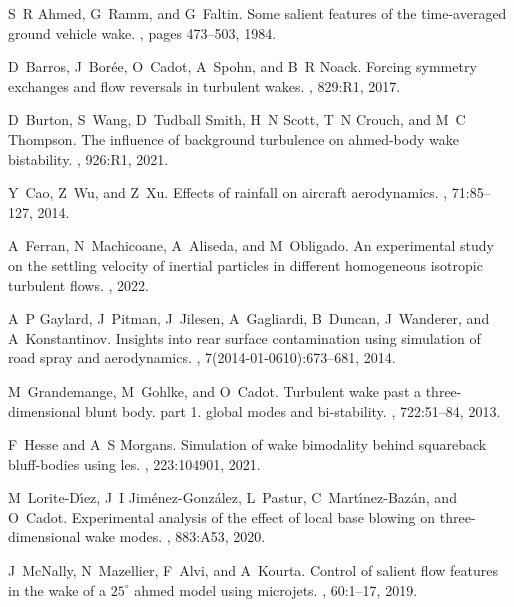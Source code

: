 \documentclass[doublecol]{epl2}
\begin{document}
\begin{thebibliography}{10}

S~R Ahmed, G~Ramm, and G~Faltin.
\newblock Some salient features of the time-averaged ground vehicle wake.
, pages 473--503, 1984.

D~Barros, J~Bor{\'e}e, O~Cadot, A~Spohn, and B~R Noack.
\newblock Forcing symmetry exchanges and flow reversals in turbulent wakes.
, 829:R1, 2017.

D~Burton, S~Wang, D~Tudball Smith, H~N Scott, T~N Crouch, and M~C Thompson.
\newblock The influence of background turbulence on ahmed-body wake
  bistability.
, 926:R1, 2021.

Y~Cao, Z~Wu, and Z~Xu.
\newblock Effects of rainfall on aircraft aerodynamics.
, 71:85--127, 2014.

A~Ferran, N~Machicoane, A~Aliseda, and M~Obligado.
\newblock An experimental study on the settling velocity of inertial particles
  in different homogeneous isotropic turbulent flows.
, 2022.

A~P Gaylard, J~Pitman, J~Jilesen, A~Gagliardi, B~Duncan, J~Wanderer, and
  A~Konstantinov.
\newblock Insights into rear surface contamination using simulation of road
  spray and aerodynamics.
,
  7(2014-01-0610):673--681, 2014.

M~Grandemange, M~Gohlke, and O~Cadot.
\newblock Turbulent wake past a three-dimensional blunt body. part 1. global
  modes and bi-stability.
, 722:51--84, 2013.

F~Hesse and A~S Morgans.
\newblock Simulation of wake bimodality behind squareback bluff-bodies using
  les.
, 223:104901, 2021.

M~Lorite-D{\'\i}ez, J~I Jim{\'e}nez-Gonz{\'a}lez, L~Pastur,
  C~Mart{\'\i}nez-Baz{\'a}n, and O~Cadot.
\newblock Experimental analysis of the effect of local base blowing on
  three-dimensional wake modes.
, 883:A53, 2020.

J~McNally, N~Mazellier, F~Alvi, and A~Kourta.
\newblock Control of salient flow features in the wake of a $25^{\circ}$ ahmed
  model using microjets.
, 60:1--17, 2019.


\end{thebibliography}
\end{document}
